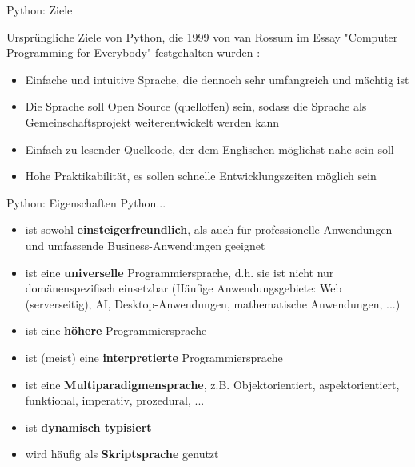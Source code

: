     \begin{frame}{Python: Ziele}
        
        Ursprüngliche Ziele von Python, die 1999 von van Rossum im Essay "Computer Programming for Everybody" festgehalten wurden \cite{python_darpa}:
        
        \begin{itemize}
            \item Einfache und intuitive Sprache, die dennoch sehr umfangreich und mächtig ist
            \item Die Sprache soll Open Source (quelloffen) sein, sodass die Sprache als Gemeinschaftsprojekt weiterentwickelt werden kann
            \item Einfach zu lesender Quellcode, der dem Englischen möglichst nahe sein soll
            \item Hohe Praktikabilität, es sollen schnelle Entwicklungszeiten möglich sein
        \end{itemize}
    \end{frame}
    
    \begin{frame}{Python: Eigenschaften}
        Python...
        \begin{itemize}
            \item ist sowohl \textbf{einsteigerfreundlich}, als auch für professionelle Anwendungen und umfassende Business-Anwendungen geeignet
            \item ist eine \textbf{universelle} Programmiersprache, d.h. sie ist nicht nur domänenspezifisch einsetzbar (Häufige Anwendungsgebiete: Web (serverseitig), AI, Desktop-Anwendungen, mathematische Anwendungen, ...)
            \item ist eine \textbf{höhere} Programmiersprache
            \item ist (meist) eine \textbf{interpretierte} Programmiersprache
            \item ist eine \textbf{Multiparadigmensprache}, z.B. Objektorientiert, aspektorientiert, funktional, imperativ, prozedural, ...
            \item ist \textbf{dynamisch typisiert} 
            \item wird häufig als \textbf{Skriptsprache} genutzt
        \end{itemize}
    \end{frame}
    
